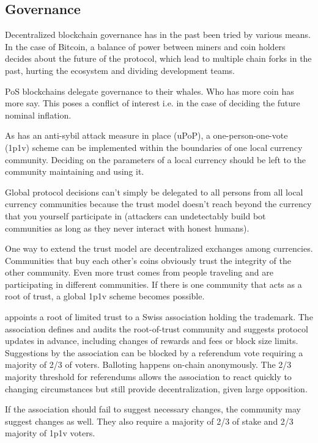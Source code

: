 \documentclass[conference]{IEEEtran}
\begin{document}
\subsection{Governance}
Decentralized blockchain governance has in the past been tried by various means. In the case of Bitcoin, a balance of power between miners and coin holders decides about the future of the protocol, which lead to multiple chain forks in the past, hurting the ecosystem and dividing development teams. 

PoS blockchains delegate governance to their whales. Who has more coin has more say. This poses a conflict of interest i.e. in the case of deciding the future nominal inflation. 

As \encointer has an anti-sybil attack measure in place (uPoP), a one-person-one-vote (1p1v) scheme can be implemented within the boundaries of one local currency community. Deciding on the parameters of a local currency should be left to the community maintaining and using it.

Global protocol decisions can't simply be delegated to all persons from all local currency communities because the trust model doesn't reach beyond the currency that you yourself participate in (attackers can undetectably build bot communities as long as they never interact with honest humans). 

One way to extend the trust model are decentralized exchanges among \encointer currencies. Communities that buy each other's coins obviously trust the integrity of the other community. Even more trust comes from people traveling and are participating in different communities. If there is one community that acts as a root of trust, a global 1p1v scheme becomes possible.

\encointer appoints a root of limited trust to a Swiss association holding the \encointer trademark. 
The association defines and audits the root-of-trust community and suggests protocol updates in advance, including changes of rewards and fees or block size limits. Suggestions by the association can be blocked by a referendum vote requiring a majority of 2/3 of voters. Balloting happens on-chain anonymously. The 2/3 majority threshold for referendums allows the association to react quickly to changing circumstances but still provide decentralization, given large opposition.

If the \encointer association should fail to suggest necessary changes, the community may suggest changes as well. They also require a majority of 2/3 of stake and 2/3 majority of 1p1v voters.
\end{document}
